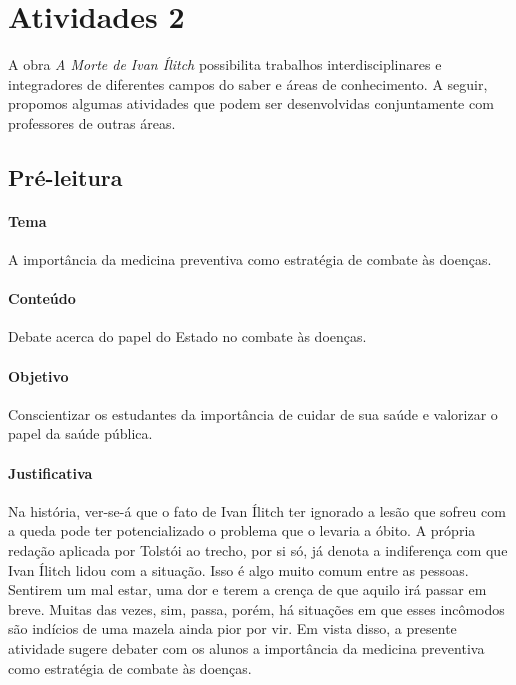 \documentclass[12pt]{extarticle}
\begin{document}
\section{Atividades 2}



A obra \emph{A Morte de Ivan Ílitch} possibilita trabalhos
interdisciplinares e integradores de diferentes campos do saber e áreas
de conhecimento. A seguir, propomos algumas atividades que podem ser
desenvolvidas conjuntamente com professores de outras áreas.

\subsection{Pré-leitura}

\paragraph{Tema} A importância da medicina preventiva como
estratégia de combate às doenças.

\paragraph{Conteúdo} Debate acerca do papel do Estado no combate às doenças.

\paragraph{Objetivo} Conscientizar os estudantes da importância de cuidar
de sua saúde e valorizar o papel da saúde pública.

\paragraph{Justificativa} Na história, ver-se-á que o fato de Ivan Ílitch ter ignorado
a lesão que sofreu com a queda pode ter potencializado o problema que o
levaria a óbito. A própria redação aplicada por Tolstói ao trecho, por
si só, já denota a indiferença com que Ivan Ílitch lidou com a situação.
Isso é algo muito comum entre as pessoas. Sentirem um mal estar, uma dor
e terem a crença de que aquilo irá passar em breve. Muitas das vezes,
sim, passa, porém, há situações em que esses incômodos são indícios de
uma mazela ainda pior por vir. Em vista disso, a presente atividade
sugere debater com os alunos a importância da medicina preventiva como
estratégia de combate às doenças.
\end{document}
